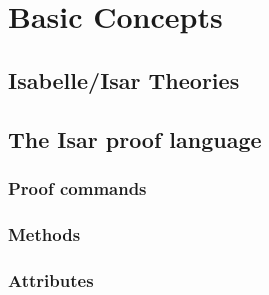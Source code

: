 
\chapter{Basic Concepts}

\section{Isabelle/Isar Theories}

\section{The Isar proof language}

\subsection{Proof commands}

\subsection{Methods}

\subsection{Attributes}


